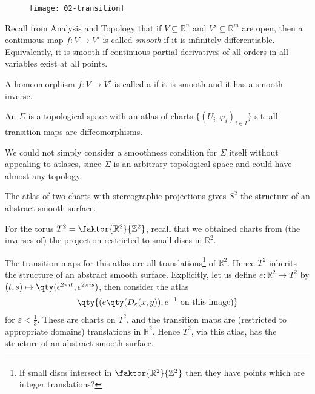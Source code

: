 \begin{figure}[h] 
    \centering 
    \texttt{[image: 02-transition]} 
\end{figure}

Recall from Analysis and Topology that if $V \subseteq \mathbb R^n$ and $V' \subseteq \mathbb R^m$ are open, then a continuous map $f \colon V \to V'$ is called \textit{smooth} if it is infinitely differentiable.
Equivalently, it is smooth if continuous partial derivatives of all orders in all variables exist at all points.

\begin{definition}[Diffeomorphism]
	A homeomorphism $f : V \to V'$ is called a  if it is smooth and it has a smooth inverse.
\end{definition} 

\begin{definition}
	An  $\Sigma$ is a topological space with an atlas of charts $\{(U_i, \varphi_i)_{i \in I}\}$ s.t. all transition maps are diffeomorphisms.
\end{definition}

\begin{remark}
	We could not simply consider a smoothness condition for $\Sigma$ itself without appealing to atlases, since $\Sigma$ is an arbitrary topological space and could have almost any topology.
\end{remark}

\begin{example}
	The atlas of two charts with stereographic projections gives $S^2$ the structure of an abstract smooth surface.
\end{example}

\begin{example}
	For the torus $T^2 = \faktor{\mathbb R^2}{\mathbb Z^2}$, recall that we obtained charts from (the inverses of) the projection restricted to small discs in $\mathbb{R}^2$.

	The transition maps for this atlas are all translations\footnote{If small discs intersect in $\faktor{\mathbb R^2}{\mathbb Z^2}$ then they have points which are integer translations?} of $\mathbb R^2$.
	Hence $T^2$ inherits the structure of an abstract smooth surface.
	Explicitly, let us define $e \colon \mathbb R^2 \to T^2$ by $(t,s) \mapsto \qty(e^{2\pi i t}, e^{2 \pi i s})$, then consider the atlas
	\begin{align*}
		\qty{(e\qty(D_\varepsilon(x,y)), e^{-1} \text{ on this image})}
	\end{align*}
	for $\varepsilon < \frac{1}{3}$.
	These are charts on $T^2$, and the transition maps are (restricted to appropriate domains) translations in $\mathbb R^2$.
	Hence $T^2$, via this atlas, has the structure of an abstract smooth surface.
\end{example}

